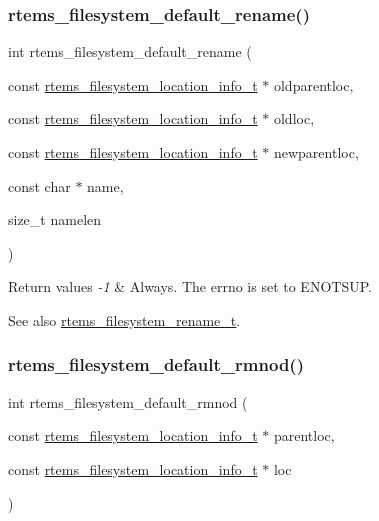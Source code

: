 \subsubsection{\texorpdfstring{rtems\_filesystem\_default\_rename()}{rtems\_filesystem\_default\_rename()}}
{\footnotesize\ttfamily int rtems\+\_\+filesystem\+\_\+default\+\_\+rename (\begin{DoxyParamCaption}\item[{const \mbox{\hyperlink{group__LibIO_ga3252b3d31ee3c49ffff0b7604a676864}{rtems\+\_\+filesystem\+\_\+location\+\_\+info\+\_\+t}} $\ast$}]{oldparentloc,  }\item[{const \mbox{\hyperlink{group__LibIO_ga3252b3d31ee3c49ffff0b7604a676864}{rtems\+\_\+filesystem\+\_\+location\+\_\+info\+\_\+t}} $\ast$}]{oldloc,  }\item[{const \mbox{\hyperlink{group__LibIO_ga3252b3d31ee3c49ffff0b7604a676864}{rtems\+\_\+filesystem\+\_\+location\+\_\+info\+\_\+t}} $\ast$}]{newparentloc,  }\item[{const char $\ast$}]{name,  }\item[{size\+\_\+t}]{namelen }\end{DoxyParamCaption})}


\begin{DoxyRetVals}{Return values}
{\em -\/1} & Always. The errno is set to E\+N\+O\+T\+S\+UP.\\
\hline
\end{DoxyRetVals}
\begin{DoxySeeAlso}{See also}
\mbox{\hyperlink{group__LibIOFSOps_ga6b92b1f0dc00c743d3fc99cebbeb22bf}{rtems\+\_\+filesystem\+\_\+rename\+\_\+t}}. 
\end{DoxySeeAlso}
\mbox{\label{group__LibIOFSOps_ga63601e9ffafa64ffa19065810db9d95c}} 
\subsubsection{\texorpdfstring{rtems\_filesystem\_default\_rmnod()}{rtems\_filesystem\_default\_rmnod()}}
{\footnotesize\ttfamily int rtems\+\_\+filesystem\+\_\+default\+\_\+rmnod (\begin{DoxyParamCaption}\item[{const \mbox{\hyperlink{group__LibIO_ga3252b3d31ee3c49ffff0b7604a676864}{rtems\+\_\+filesystem\+\_\+location\+\_\+info\+\_\+t}} $\ast$}]{parentloc,  }\item[{const \mbox{\hyperlink{group__LibIO_ga3252b3d31ee3c49ffff0b7604a676864}{rtems\+\_\+filesystem\+\_\+location\+\_\+info\+\_\+t}} $\ast$}]{loc }\end{DoxyParamCaption})}


